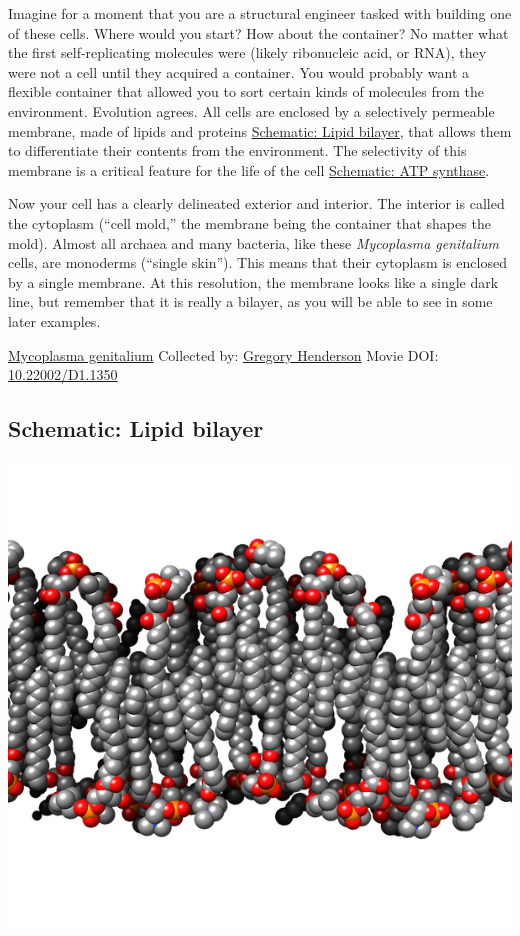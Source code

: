 \documentclass[]{tufte-book}
\begin{document}
Imagine for a moment that you are a structural engineer tasked with building one of these cells. Where would you start? How about the container? No matter what the first self-replicating molecules were (likely ribonucleic acid, or RNA), they were not a cell until they acquired a container. You would probably want a flexible container that allowed you to sort certain kinds of molecules from the environment. Evolution agrees. All cells are enclosed by a selectively permeable membrane, made of lipids and proteins \protect\hyperlink{Lipid_bilayer}{Schematic: Lipid bilayer}, that allows them to differentiate their contents from the environment. The selectivity of this membrane is a critical feature for the life of the cell \protect\hyperlink{ATP_synthase_and_energy_production}{Schematic: ATP synthase}.

Now your cell has a clearly delineated exterior and interior. The interior is called the cytoplasm (``cell mold,'' the membrane being the container that shapes the mold). Almost all archaea and many bacteria, like these \emph{Mycoplasma genitalium} cells, are monoderms (``single skin''). This means that their cytoplasm is enclosed by a single membrane. At this resolution, the membrane looks like a single dark line, but remember that it is really a bilayer, as you will be able to see in some later examples.



\hypertarget{htmlwidget-b71cfaf86f443f3b26ed}{}

\label{fig:2-1}\protect\hyperlink{tree}{Mycoplasma genitalium} Collected by: \protect\hyperlink{gregory_henderson}{Gregory Henderson} Movie DOI: \href{https://doi.org/10.22002/D1.1350}{10.22002/D1.1350}

\hypertarget{Lipid_bilayer}{%
\subsection*{Schematic: Lipid bilayer}\label{Lipid_bilayer}}

\includegraphics{img/schematics/2_1_1}
\end{document}
